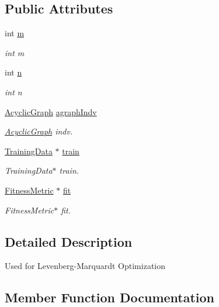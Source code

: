 \subsection*{Public Attributes}
\begin{DoxyCompactItemize}
\item 
int \hyperlink{structLMFunctor_a090d075bceebea8c93aa70a99e7620d5}{m}
\begin{DoxyCompactList}\small\item\em int m \end{DoxyCompactList}\item 
int \hyperlink{structLMFunctor_a97d53b5fcdf96c8ffe5ea70b7adc0de4}{n}
\begin{DoxyCompactList}\small\item\em int n \end{DoxyCompactList}\item 
\hyperlink{classAcyclicGraph}{Acyclic\+Graph} \hyperlink{structLMFunctor_aece2cab33ffd2f919fe9e6817e3a85ac}{agraph\+Indv}
\begin{DoxyCompactList}\small\item\em \hyperlink{classAcyclicGraph}{Acyclic\+Graph} indv. \end{DoxyCompactList}\item 
\hyperlink{structTrainingData}{Training\+Data} $\ast$ \hyperlink{structLMFunctor_a025c08d9282710fb0766dcee6dd8ff07}{train}
\begin{DoxyCompactList}\small\item\em Training\+Data$\ast$ train. \end{DoxyCompactList}\item 
\hyperlink{structFitnessMetric}{Fitness\+Metric} $\ast$ \hyperlink{structLMFunctor_a39d6ef99670d28134bd7a903993f5e23}{fit}
\begin{DoxyCompactList}\small\item\em Fitness\+Metric$\ast$ fit. \end{DoxyCompactList}\end{DoxyCompactItemize}


\subsection{Detailed Description}
Used for Levenberg-\/\+Marquardt Optimization 

\subsection{Member Function Documentation}
